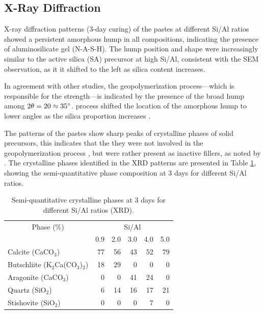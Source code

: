 \subsection{X-Ray Diffraction}

X-ray diffraction patterns (3-day curing) of the pastes at different Si/Al ratios showed a persistent amorphous hump in all compositions, indicating the presence of aluminosilicate gel (N-A-S-H).
The hump position and shape were increasingly similar to the active silica (SA) precursor at high Si/Al, consistent with the SEM observation, as it it shifted to the left as silica content increases. 

In agreement with other studies, the geopolymerization process—which is responsible for the strength—is indicated by the presence of the broad hump among $2\theta = 20 \approx 35^{\circ}$.
process shifted the location of the amorphous hump to lower angles as the silica proportion increases \cite{arellano2014geopolymer,lee2017strength, wan2017geopolymerization}.

The patterns of the pastes show sharp peaks of crystalline phases of solid precursors, this indicates that the they were not involved in the geopolymerization process \cite{Geraldo2020}, but were rather present as inactive fillers, as noted by \cite{ruiz2012alkaline}.
The crystalline phases identified in the XRD patterns are presented in Table \ref{tab:xrd_phases_pastes}, showing the semi-quantitative phase composition at 3 days for different Si/Al ratios.

\begin{table}[H]
    \centering
    \caption{Semi-quantitative crystalline phases at 3 days for different Si/Al ratios (XRD).}
    \label{tab:xrd_phases_pastes}
    \begin{tabular}{lrrrrr}
        \hline
        \multicolumn{1}{c}{Phase (\%)} &
        \multicolumn{5}{c}{Si/Al}\\
        \cline{2-6}
        & 0.9 & 2.0 & 3.0 & 4.0 & 5.0 \\
        \hline
        Calcite (CaCO$_3$) & 77 & 56 & 43 & 52 & 79 \\
        Butschliite (K$_2$Ca(CO$_3$)$_2$) & 18 & 29 & 0 & 0 & 0 \\
        Aragonite (CaCO$_3$) & 0 & 0 & 41 & 24 & 0 \\
        Quartz (SiO$_2$) & 6 & 14 & 16 & 17 & 21 \\
        Stishovite (SiO$_2$) & 0 & 0 & 0 & 7 & 0 \\
        \hline
    \end{tabular}
\end{table}

